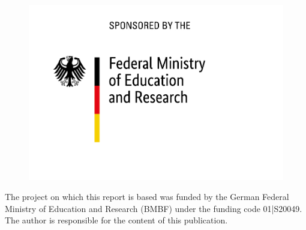 \documentclass[runningheads]{llncs}
\begin{document}
\begin{figure}[!h]
    \includegraphics[width=0.45\linewidth]{images/BMBF.jpg}
\end{figure}
The project on which this report is based was funded by the German Federal Ministry of Education and Research (BMBF) under the funding code 01|S20049. The author is responsible for the content of this publication.\\



\end{document}

